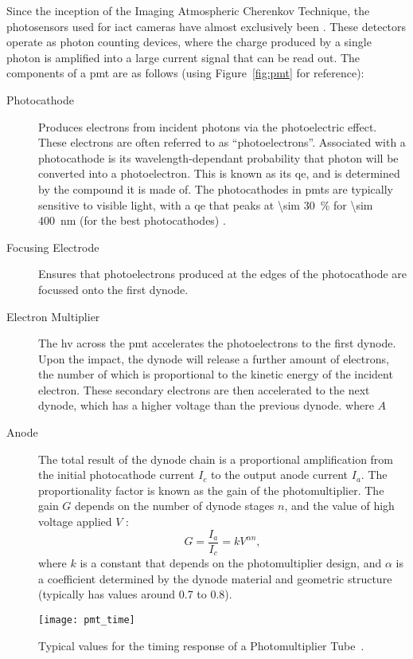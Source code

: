 Since the inception of the Imaging Atmospheric Cherenkov Technique, the photosensors used for \gls{iact} cameras have almost exclusively been  \cite{Weekes2003}. These detectors operate as photon counting devices, where the charge produced by a single photon is amplified into a large current signal that can be read out. The components of a \gls{pmt} are as follows (using Figure~\ref{fig:pmt} for reference):
\begin{description}
\item [Photocathode] Produces electrons from incident photons via the photoelectric effect. These electrons are often referred to as ``photoelectrons''. Associated with a photocathode is its wavelength-dependant probability that photon will be converted into a photoelectron. This is known as its \gls{qe}, and is determined by the compound it is made of. The photocathodes in \glspl{pmt} are typically sensitive to visible light, with a \gls{qe} that peaks at \SI{\sim 30}{\percent} for \SI{\sim 400}{nm} (for the best photocathodes) \cite{Hamamatsu2016}.
\item [Focusing Electrode] Ensures that photoelectrons produced at the edges of the photocathode are focussed onto the first dynode.
\item [Electron Multiplier] The \gls{hv} across the \gls{pmt} accelerates the photoelectrons to the first dynode. Upon the impact, the dynode will release a further amount of electrons, the number of which is proportional to the kinetic energy of the incident electron. These secondary electrons are then accelerated to the next dynode, which has a higher voltage than the previous dynode. 
where $A$ 
\item [Anode] The total result of the dynode chain is a proportional amplification from the initial photocathode current $I_c$ to the output anode current $I_a$. The proportionality factor is known as the gain of the photomultiplier. The gain $G$ depends on the number of dynode stages $n$, and the value of high voltage applied $V$ \cite{Hamamatsu2016}:
\begin{equation} \label{eq:pmt_gain}
G = \frac{I_a}{I_c} = k V^{\alpha n},
\end{equation}
where $k$ is a constant that depends on the photomultiplier design, and $\alpha$ is a coefficient determined by the dynode material and geometric structure (typically has values around 0.7 to 0.8).
\end{description}

\begin{figure}
	\centering
    \texttt{[image: pmt\_time]} 
	\caption[Photomultiplier Tube timing characteristics.]{Typical values for the timing response of a Photomultiplier Tube~\cite{Hamamatsu2016}.}
	\label{fig:pmt_time}
\end{figure}


